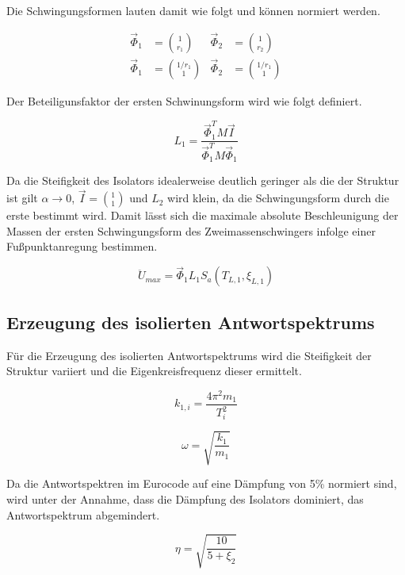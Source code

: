 Die Schwingungsformen lauten damit wie folgt und können normiert werden.

\begin{align}
\vec{\Phi}_1 &= \binom{1}{r_1} & \vec{\Phi}_2 &= \binom{1}{r_2}\\
\vec{\Phi}_1 &= \binom{1/r_1}{1} & \vec{\Phi}_2 &= \binom{1/r_1}{1}
\end{align}

Der Beteiligunsfaktor der ersten Schwinungsform wird wie folgt definiert.

\begin{equation}
L_1 = \frac{\vec{\Phi}_1^T M \vec{I}}{\vec{\Phi}_1^T M \vec{\Phi}_1}
\end{equation}

Da die Steifigkeit des Isolators idealerweise deutlich geringer als die der Struktur ist gilt $\alpha \rightarrow 0$, $\vec{I} = \binom{1}{1}$ und $L_2$ wird klein, da die Schwingungsform durch die erste bestimmt wird.
Damit lässt sich die maximale absolute Beschleunigung der Massen der ersten Schwingungsform des Zweimassenschwingers infolge einer Fußpunktanregung bestimmen.

\begin{equation}
\ddot U_{max} = \vec{\Phi}_1 L_1 S_a(T_{L,1}, \xi_{L,1})
\end{equation}

\subsection{Erzeugung des isolierten Antwortspektrums}
\label{sec:vereinfAWS}

Für die Erzeugung des isolierten Antwortspektrums wird die Steifigkeit der Struktur variiert und die Eigenkreisfrequenz dieser ermittelt.

\begin{equation}
k_{1,i} = \frac{4 \pi^2 m_1}{T_i^2}
\end{equation}

\begin{equation}
\omega = \sqrt{\frac{k_1}{m_1}}
\end{equation}

Da die Antwortspektren im Eurocode auf eine Dämpfung von 5\% normiert sind, wird unter der Annahme, dass die Dämpfung des Isolators dominiert, das Antwortspektrum abgemindert.

\begin{equation}\label{eta}
\eta = \sqrt{\frac{10}{5 + \xi_2}}
\end{equation}

